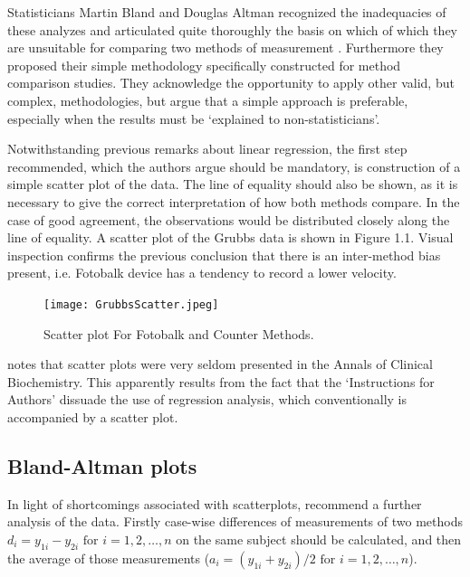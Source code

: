 \documentclass[12pt, a4paper]{report}
\theoremstyle{plain}
\theoremstyle{definition}
\theoremstyle{remark}
\begin{document}
Statisticians Martin Bland and Douglas Altman recognized the inadequacies of these analyzes and
articulated quite thoroughly the basis on which of which they are unsuitable for comparing two methods of measurement \citep*{BA83}. Furthermore they proposed their simple methodology specifically
constructed for method comparison studies. They acknowledge the opportunity to apply other valid, but complex, methodologies, but argue that a simple approach is preferable, especially when the
results must be `explained to non-statisticians'.

Notwithstanding previous remarks about linear regression, the first step recommended, which the authors argue should be mandatory, is construction of a simple scatter plot of the data. The line of equality should also be shown, as it is necessary to give the correct interpretation of how both methods compare. In the case of good agreement, the observations would be distributed closely along the line of equality. A scatter plot of the Grubbs data is shown in Figure 1.1. Visual inspection confirms the previous conclusion that there is an inter-method bias present, i.e. Fotobalk device has a tendency to record a lower velocity.

\begin{figure}[h!]
\begin{center}
  \texttt{[image: GrubbsScatter.jpeg]}
  \caption{Scatter plot For Fotobalk and Counter Methods.}\label{GrubbsScatter}
\end{center}
\end{figure}

\citet{Dewitte} notes that scatter plots were very seldom
presented in the Annals of Clinical Biochemistry. This apparently
results from the fact that the `Instructions for Authors' dissuade
the use of regression analysis, which conventionally is
accompanied by a scatter plot.

\newpage
\subsection{Bland-Altman plots}

In light of shortcomings associated with scatterplots,
\citet*{BA83} recommend a further analysis of the data. Firstly
case-wise differences of measurements of two methods $d_{i} =
y_{1i}-y_{2i} \mbox{ for }i=1,2,\dots,n$ on the same subject
should be calculated, and then the average of those measurements
($a_{i} = (y_{1i} + y_{2i})/2 \mbox{ for }i=1,2,\dots, n$).
\end{document}
